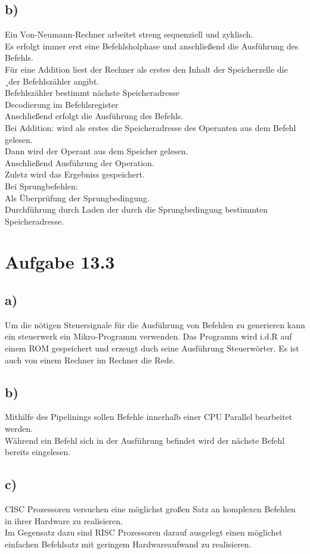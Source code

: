 \documentclass{article}
\begin{document}
	\subsection*{b)}
	Ein Von-Neumann-Rechner arbeitet streng sequenziell und zyklisch. \\
	Es erfolgt immer erst eine Befehlsholphase und anschließend die Ausführung des Befehls. \\
	Für eine Addition liest der Rechner als erstes den Inhalt der Speicherzelle die ¸der Befehlszähler angibt. \\
	Befehlszähler bestimmt nächste Speicheradresse \\
	Decodierung im Befehlsregister \\
	Anschließend erfolgt die Ausführung des Befehls. \\
	Bei Addition: wird als erstes die Speicheradresse des Operanten aus dem Befehl gelesen. \\
	Dann wird der Operant aus dem Speicher gelesen. \\
	Anschließend Ausführung der Operation. \\
	Zuletz wird das Ergebniss gespeichert. \\
	Bei Sprungbefehlen: \\
	Als Überprüfung der Sprungbedingung. \\
	Durchführung durch Laden der durch die Sprungbedingung bestimmten Speicheradresse.
	\section*{Aufgabe 13.3}
	\subsection*{a)}
	Um die nötigen Steuersignale für die Ausführung von Befehlen zu generieren kann ein steuerwerk ein Mikro-Programm verwenden. Das Programm wird i.d.R auf einem ROM gespeichert und erzeugt duch seine Ausführung Steuerwörter. Es ist auch von einem Rechner im Rechner die Rede.
	\subsection*{b)}
	Mithilfe des Pipelinings sollen Befehle innerhalb einer CPU Parallel bearbeitet werden. \\
	Während ein Befehl sich in der Ausführung befindet wird der nächste Befehl bereits eingelesen.
	\subsection*{c)}
	CISC Prozessoren versuchen eine möglichst großen Satz an komplexen Befehlen in ihrer Hardware zu realisieren. \\
	Im Gegensatz dazu sind RISC Prozessoren darauf ausgelegt einen möglichst einfachen Befehlsatz mit geringem Hardwareaufwand zu realisieren. 
\end{document}
